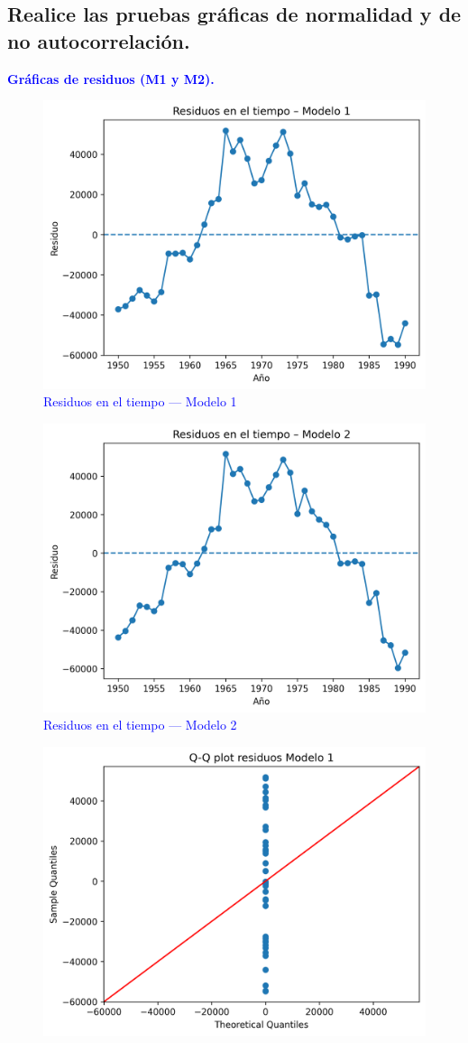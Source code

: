 \documentclass[10pt]{article}
\begin{document}
\subsection{Realice las pruebas gráficas de normalidad y de no autocorrelación.}
\textcolor{blue}{
\textbf{Gráficas de residuos (M1 y M2).}
\begin{figure}[H]
    \centering
    \includegraphics[width=0.7\linewidth]{../plots/python/ex8/ex8_residuos_m1.png}
    \caption{Residuos en el tiempo — Modelo 1}
\end{figure}
\begin{figure}[H]
    \centering
    \includegraphics[width=0.7\linewidth]{../plots/python/ex8/ex8_residuos_m2.png}
    \caption{Residuos en el tiempo — Modelo 2}
\end{figure}
\begin{figure}[H]
    \centering
    \includegraphics[width=0.48\linewidth]{../plots/python/ex8/ex8_qq_m1.png}\hfill

\end{figure}}
\end{document}
